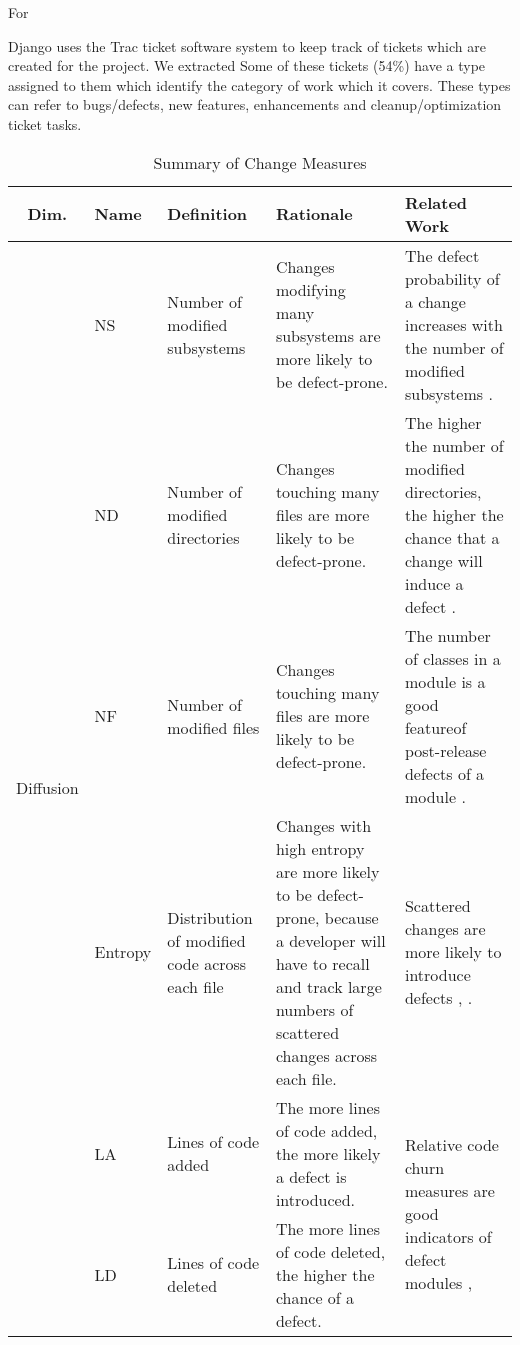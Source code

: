 \documentclass[10pt, conference]{IEEEtran}
\begin{document}
For 

Django uses the Trac ticket software system to keep track of tickets which are created for the project. We extracted Some of these tickets (54\%) have a type assigned to them which identify the category of work which it covers. These types can refer to bugs/defects, new features, enhancements and cleanup/optimization ticket tasks. 


\begin{table}
	\onecolumn
	\caption{Summary of Change Measures}
\begin{tabular}{|c|l|p{2.5cm}|p{5.5cm}|p{5.25cm}|}
	\hline Dim. & Name & Definition & Rationale & Related Work \\ 
	\hline \multirow{14}{*}{\begin{sideways}Diffusion\end{sideways}} & NS & Number of modified subsystems  & Changes modifying many subsystems are more likely to be defect-prone. & The defect probability of a change increases with the number of modified subsystems \cite{Mockus2000Bell}. \\ \cline{2-5}  
	 & ND & Number of modified directories & Changes touching many files are more likely to be defect-prone. & The higher the number of modified directories, the higher the chance that a change will induce a defect \cite{Mockus2000Bell}. \\ \cline{2-5}  
	 & NF & Number of modified files & Changes touching many files are more likely to be defect-prone. & The number of classes in a module is a good featureof post-release defects of a module \cite{Nagappan2006ICSE}. \\ \cline{2-5} 
	 & Entropy & Distribution of modified code across each file & Changes with high entropy are more likely to be defect-prone, because a developer will have to recall and track large numbers of scattered changes across each file. & Scattered changes are more likely to introduce defects \cite{DAmbross2010MSR}, \cite{Hassan2009ICSE}. \\ 
	\hline \multirow{4}{*}{\begin{sideways}Size\end{sideways}} & LA & Lines of code added & The more lines of code added, the more likely a defect is introduced. & \multirow{2}{5.25cm}{Relative code churn measures are good indicators of defect modules \cite{Moser2008ICSE}, \cite{Nagappan2005ICSE}}. \\ \cline{2-4} 
	  & LD & Lines of code deleted & The more lines of code deleted, the higher the chance of a defect. &  \\ 

\end{tabular}
\end{table}
\end{document}
